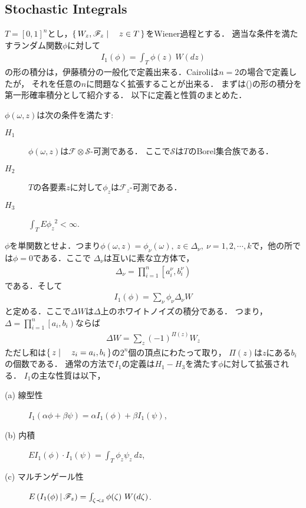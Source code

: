 \subsection{Stochastic Integrals}
	$T=[0,1]^{n}$とし，$\left\{\, W_{z},\mathscr{F}_{z} \mid \quad z \in T\, \right\}$をWiener過程とする．
	適当な条件を満たすランダム関数$\phi$に対して
	\begin{align}
		I_{1}(\phi) = \int_{T} \phi(z)\ W(dz)
		\label{fom:Stochastic_Integrals_1}
	\end{align}
	の形の積分は，伊藤積分の一般化で定義出来る．Cairoliは$n=2$の場合で定義したが，
	それを任意の$n$に問題なく拡張することが出来る．
	まずは()の形の積分を第一形確率積分として紹介する．
	以下に定義と性質のまとめた．
	
	$\phi(\omega,z)$は次の条件を満たす:
	\begin{description}
		\item[$H_{1}$] $\phi(\omega,z)$は$\mathscr{F} \otimes \mathscr{S}$-可測である．
			ここで$\mathscr{S}$は$T$のBorel集合族である．
			
		\item[$H_{2}$] $T$の各要素$z$に対して$\phi_{z}$は$\mathscr{F}_{z}$-可測である．
		
		\item[$H_{3}$] $\int_{T} E{\phi_{z}}^{2} < \infty$.
	\end{description}
	
	$\phi$を単関数とせよ．つまり$\phi(\omega,z) = \phi_{\nu}(\omega),\ z \in \Delta_{\nu},\
	\nu = 1,2,\cdots,k$で，他の所では$\phi = 0$である．ここで
	$\Delta_{\nu}$は互いに素な立方体で，
	\begin{align}
		\Delta_{\nu} = \prod_{i=1}^{n} \left[a^{\nu}_{i}, b^{\nu}_{i}\right)
	\end{align}
	である．そして
	\begin{align}
		I_{1}(\phi) = \sum_{\nu} \phi_{\nu} \Delta_{\nu} W
	\end{align}
	と定める．ここで$\Delta W$は$\Delta$上のホワイトノイズの積分である．
	つまり，$\Delta = \prod_{i=1}^{n} \left[a_{i}, b_{i}\right)$ならば
	\begin{align}
		\Delta W = \sum_{z} (-1)^{\Pi(z)} W_{z}
	\end{align}
	ただし和は$\left\{\, z \mid \quad z_{i} = a_{i},b_{i}\, \right\}$の$2^{n}$個の頂点にわたって取り，
	$\Pi(z)$は$z$にある$b_{i}$の個数である．
	通常の方法で$I_{1}$の定義は$H_{1}-H_{3}$を満たす$\phi$に対して拡張される．
	$I_{1}$の主な性質は以下，
	\begin{description}
		\item[(a) 線型性] $I_{1}(\alpha \phi + \beta \psi) 
			= \alpha I_{1}(\phi) + \beta I_{1}(\psi)$,
		\item[(b) 内積] $EI_{1}(\phi) \cdot I_{1}(\psi) = \int_{T} \phi_{z}\psi_{z}\ dz$,
		\item[(c) マルチンゲール性] $E\left( I_{1}(\phi) \, \middle|\, \mathscr{F}_{z} \right)
			= \int_{\zeta \prec z} \phi(\zeta)\ W(d\zeta)$.
	\end{description}
	
